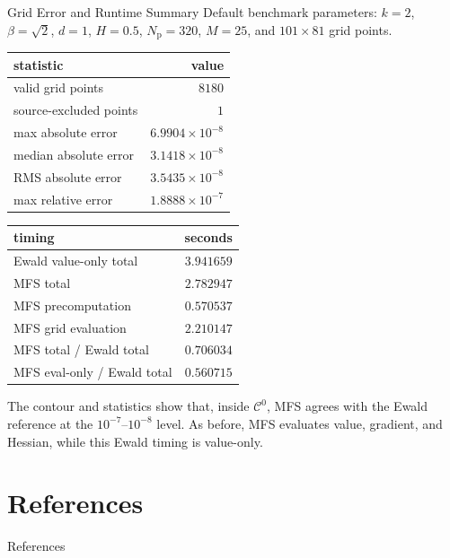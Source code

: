 \documentclass[aspectratio=169]{beamer}
\newcommand{\Czero}{\mathcal C^0}
\begin{document}
\begin{frame}{Grid Error and Runtime Summary}
  \scriptsize
  Default benchmark parameters:
  \(k=2\), \(\beta=\sqrt2\), \(d=1\), \(H=0.5\),
  \(N_{\mathrm p}=320\), \(M=25\), and \(101\times81\) grid points.

  \vspace{0.2em}
  \begin{center}
  \renewcommand{\arraystretch}{1.12}
  \begin{tabular}{lr}
    \hline
    statistic & value\\
    \hline
    valid grid points & \(8180\)\\
    source-excluded points & \(1\)\\
    max absolute error & \(6.9904{\times}10^{-8}\)\\
    median absolute error & \(3.1418{\times}10^{-8}\)\\
    RMS absolute error & \(3.5435{\times}10^{-8}\)\\
    max relative error & \(1.8888{\times}10^{-7}\)\\
    \hline
  \end{tabular}
  \qquad
  \begin{tabular}{lr}
    \hline
    timing & seconds\\
    \hline
    Ewald value-only total & \(3.941659\)\\
    MFS total & \(2.782947\)\\
    MFS precomputation & \(0.570537\)\\
    MFS grid evaluation & \(2.210147\)\\
    MFS total / Ewald total & \(0.706034\)\\
    MFS eval-only / Ewald total & \(0.560715\)\\
    \hline
  \end{tabular}
  \end{center}

  \vspace{0.3em}
  The contour and statistics show that, inside \(\Czero\), MFS agrees with
  the Ewald reference at the \(10^{-7}\)--\(10^{-8}\) level.  As before,
  MFS evaluates value, gradient, and Hessian, while this Ewald timing is
  value-only.
\end{frame}

\section{References}

\begin{frame}[allowframebreaks]{References}
  
  
\end{frame}
\end{document}
